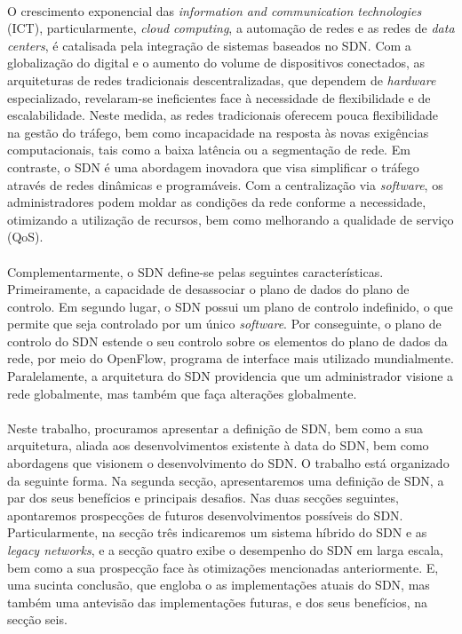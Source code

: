 \documentclass{llncs}
\begin{document}
\paragraph{} O crescimento exponencial das \textit {information and communication technologies} (ICT), particularmente, \textit {cloud computing}, a automação de redes e as redes de \textit {data centers}, é catalisada pela integração de sistemas baseados no SDN. \cite{paper1}
 Com a globalização do digital e o aumento do volume de dispositivos conectados, as arquiteturas de redes tradicionais descentralizadas, que dependem de \textit {hardware} especializado, revelaram-se ineficientes face à necessidade de flexibilidade e de escalabilidade. 
 Neste medida, as redes tradicionais oferecem pouca flexibilidade na gestão do tráfego, bem como incapacidade na resposta às novas exigências computacionais, tais como a baixa latência ou a segmentação de rede. 
 Em contraste, o SDN é uma abordagem inovadora que visa simplificar o tráfego através de redes dinâmicas e programáveis. 
 Com a centralização via \textit {software}, os administradores podem moldar as condições da rede conforme a necessidade, otimizando a utilização de recursos, bem como melhorando a qualidade de serviço (QoS).
 \paragraph{}
Complementarmente, o SDN define-se pelas seguintes características. Primeiramente, a capacidade de desassociar o plano de dados do plano de controlo. \cite{paper3}
 Em segundo lugar, o SDN possui um plano de controlo indefinido, o que permite que seja controlado por um único \textit {software}.
 Por conseguinte, o plano de controlo do SDN estende o seu controlo sobre os elementos do plano de dados da rede, por meio do OpenFlow, programa de interface mais utilizado mundialmente.
 Paralelamente, a arquitetura do SDN providencia que um administrador visione a rede globalmente, mas também que faça alterações globalmente.
 \paragraph{}
Neste trabalho, procuramos apresentar a definição de SDN, bem como a sua arquitetura, aliada aos desenvolvimentos existente à data do SDN, bem como abordagens que visionem o desenvolvimento do SDN.
 O trabalho está organizado da seguinte forma. Na segunda secção, apresentaremos uma definição de SDN, a par dos seus benefícios  e principais desafios.
 Nas duas secções seguintes, apontaremos prospecções de futuros desenvolvimentos possíveis do SDN. 
 Particularmente, na secção três indicaremos um sistema híbrido do SDN e as \textit {legacy networks}, e a secção quatro exibe o desempenho do SDN em larga escala, bem como a sua prospecção face às otimizações mencionadas anteriormente. 
 E, uma sucinta conclusão, que engloba o as implementações atuais do SDN, mas também uma antevisão das implementações futuras, e dos seus benefícios, na secção seis.
\end{document}
